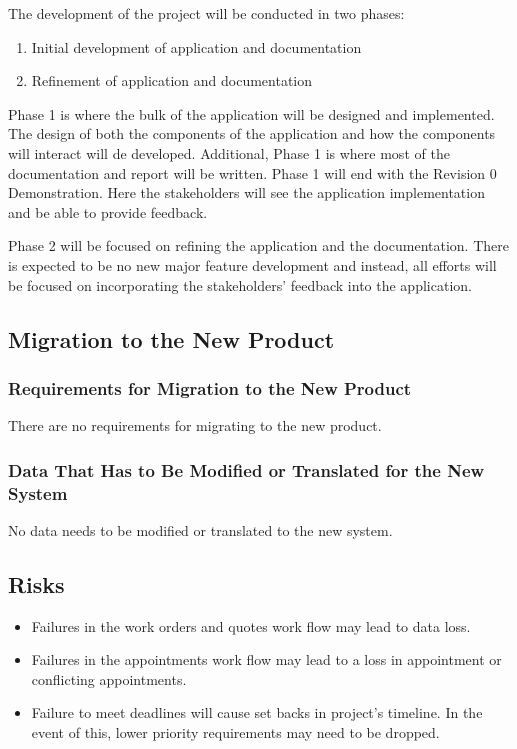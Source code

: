 \documentclass[12pt]{article}
\begin{document}
The development of the project will be conducted in two phases:

\begin{enumerate}
	\item Initial development of application and documentation
	\item Refinement of application and documentation
\end{enumerate}

Phase 1 is where the bulk of the application will be designed and implemented. The design of both
the components of the application and how the components will interact will de developed.
Additional, Phase 1 is where most of the documentation and report will be written. Phase 1 will end
with the Revision 0 Demonstration. Here the stakeholders will see the application implementation
and be able to provide feedback.

Phase 2 will be focused on refining the application and the documentation. There is expected to be
no new major feature development and instead, all efforts will be focused on incorporating the
stakeholders' feedback into the application.

\subsection{Migration to the New Product}
\subsubsection{Requirements for Migration to the New Product}

There are no requirements for migrating to the new product.

\subsubsection{Data That Has to Be Modified or Translated for the New System}

No data needs to be modified or translated to the new system.

\subsection{Risks}

\begin{itemize}
	\item Failures in the work orders and quotes work flow may lead to data loss.
	\item Failures in the appointments work flow may lead to a loss in appointment or conflicting
	      appointments.
	\item Failure to meet deadlines will cause set backs in project's timeline. In the event of this, lower
	      priority requirements may need to be dropped.
\end{itemize}
\end{document}
